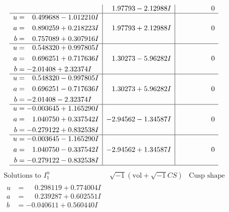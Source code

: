 \documentclass[1p]{elsarticle_modified}
\theoremstyle{definition}
\newcommand{\I}{\sqrt{-1}}
\begin{document}
$$\begin{array}{c|c|c}
 & \phantom{-}1.97793 - 2.12988 I & \phantom{-0.000000 } 0 \\ \hline\begin{aligned}
u &= \phantom{-}0.499688 - 1.012210 I \\
a &= \phantom{-}0.890259 + 0.218223 I \\
b &= \phantom{-}0.757089 + 0.307916 I\end{aligned}
 & \phantom{-}1.97793 + 2.12988 I & \phantom{-0.000000 } 0 \\ \hline\begin{aligned}
u &= \phantom{-}0.548320 + 0.997805 I \\
a &= \phantom{-}0.696251 + 0.717636 I \\
b &= -2.01408 + 2.32374 I\end{aligned}
 & \phantom{-}1.30273 - 5.96282 I & \phantom{-0.000000 } 0 \\ \hline\begin{aligned}
u &= \phantom{-}0.548320 - 0.997805 I \\
a &= \phantom{-}0.696251 - 0.717636 I \\
b &= -2.01408 - 2.32374 I\end{aligned}
 & \phantom{-}1.30273 + 5.96282 I & \phantom{-0.000000 } 0 \\ \hline\begin{aligned}
u &= -0.003645 + 1.165290 I \\
a &= \phantom{-}1.040750 + 0.337542 I \\
b &= -0.279122 + 0.832538 I\end{aligned}
 & -2.94562 - 1.34587 I & \phantom{-0.000000 } 0 \\ \hline\begin{aligned}
u &= -0.003645 - 1.165290 I \\
a &= \phantom{-}1.040750 - 0.337542 I \\
b &= -0.279122 - 0.832538 I\end{aligned}
 & -2.94562 + 1.34587 I & \phantom{-0.000000 } 0\\
 \hline 
 \end{array}$$\newpage$$\begin{array}{c|c|c}  
\text{Solutions to }I^u_{1}& \I (\text{vol} + \sqrt{-1}CS) & \text{Cusp shape}\\
 \hline 
\begin{aligned}
u &= \phantom{-}0.298119 + 0.774004 I \\
a &= \phantom{-}0.239287 + 0.602551 I \\
b &= -0.040611 + 0.560440 I\end{aligned}

\end{array}$$
\end{document}

